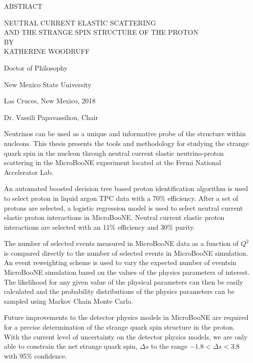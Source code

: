\begin{center}
ABSTRACT
\end{center}
\vspace{0.3in}
\begin{center}
NEUTRAL CURRENT ELASTIC SCATTERING \\ AND THE STRANGE SPIN STRUCTURE OF THE PROTON
\\
BY
\\
KATHERINE WOODRUFF
\end{center}
\vspace{0.3in}
\begin{center}
Doctor of Philosophy

New Mexico State University

Las Cruces, New Mexico, 2018

Dr. Vassili Papavassiliou, Chair
\end{center}
\vspace{0.3in}
\hspace{\parindent}
Neutrinos can be used as a unique and informative probe of the structure within
nucleons. This thesis presents the tools and methodology for studying the
strange quark spin in the nucleon through neutral current elastic
neutrino-proton scattering in the MicroBooNE experiment located at the Fermi
National Accelerator Lab.

An automated boosted decision tree based proton identification algorithm is
used to select proton in liquid argon TPC data with a 70\% efficiency. After a
set of protons are selected, a logistic regression model is used to select
neutral current elastic proton interactions in MicroBooNE. Neutral current
elastic proton interactions are selected with an 11\% efficiency and 30\%
purity.

The number of selected events measured in MicroBooNE data as a function of
$Q^2$ is compared directly to the number of selected events in MicroBooNE
simulation. An event reweighting scheme is used to vary the expected number of
eventsin MicroBooNE simulation based on the values of the physics parameters of
interest. The likelihood for any given value of the physical parameters can
then be easily calculated and the probability distributions of the physics
parameters can be sampled using Markov Chain Monte Carlo.

Future improvements to the detector physics models in MicroBooNE are required
for a precise determination of the strange quark spin structure in the proton.
With the current level of uncertainty on the detector physics models, we are
only able to constrain the net strange quark spin, $\Delta s$ to the range
$-1.8 < \Delta s < 3.8$ with 95\% confidence.

\newpage
